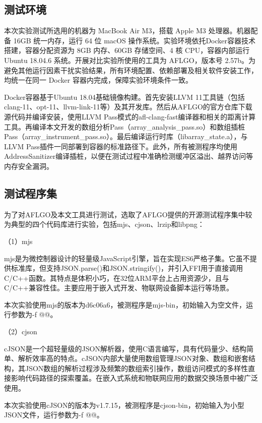 \documentclass[bachelor]{njupthesis}
\begin{document}
\subsection{测试环境}

本次实验测试所选用的机器为 MacBook Air M3，搭载 Apple M3 处理器。机器配备 16GB 统一内存，运行 64 位 macOS 操作系统。实验环境依托Docker容器技术搭建，容器分配资源为 8GB 内存、60GB 存储空间、4 核 CPU，容器内部运行 Ubuntu 18.04.6 系统。开展对比实验所使用的工具为 AFLGO，版本号 2.57b。为避免其他运行因素干扰实验结果，所有环境配置、依赖部署及相关软件安装工作，均统一在同一 Docker 容器内完成，保障实验环境条件一致。

Docker容器基于Ubuntu 18.04基础镜像构建。首先安装LLVM 11工具链（包括clang-11、opt-11、llvm-link-11等）及其开发库。然后从AFLGO的官方仓库下载源代码并编译安装，使用LLVM Pass模式的afl-clang-fast编译器和相关的距离计算工具。再编译本文开发的数组分析Pass（array\_analysis\_pass.so）和数组插桩Pass（array\_instrument\_pass.so）。最后编译运行时库（libarray\_state.a），与LLVM Pass插件一同部署到容器的标准路径下。此外，所有被测程序均使用AddressSanitizer\cite{sanitizer}编译插桩，以便在测试过程中准确检测缓冲区溢出、越界访问等内存安全漏洞。

\subsection{测试程序集}

为了对AFLGO及本文工具进行测试，选取了AFLGO提供的开源测试程序集中较为典型的四个代码库进行实验，包括mjs、cjson、lrzip和libpng：

（1）mjs

mjs是为微控制器设计的轻量级JavaScript引擎，旨在实现ES6严格子集。它虽不提供标准库，但支持JSON.parse()和JSON.stringify()，并引入FFI用于直接调用C/C++函数。其特点是体积小巧，在32位ARM平台上占用资源少，且与C/C++兼容性佳。主要应用于嵌入式开发、物联网设备脚本运行等场景。

本次实验使用mjs的版本为d6c06a6，被测程序是mjs-bin，初始输入为空文件，运行参数为-f @@。

（2）cjson

cJSON是一个超轻量级的JSON解析器，使用C语言编写，具有代码量少、结构简单、解析效率高的特点。cJSON内部大量使用数组管理JSON对象、数组和嵌套结构，其JSON数组的解析过程涉及频繁的数组索引操作，数组访问模式的多样性直接影响代码路径的探索覆盖。在嵌入式系统和物联网应用的数据交换场景中被广泛使用。

本次实验使用cJSON的版本为v1.7.15，被测程序是cjson-bin，初始输入为小型JSON文件，运行参数为-f @@。
\end{document}
